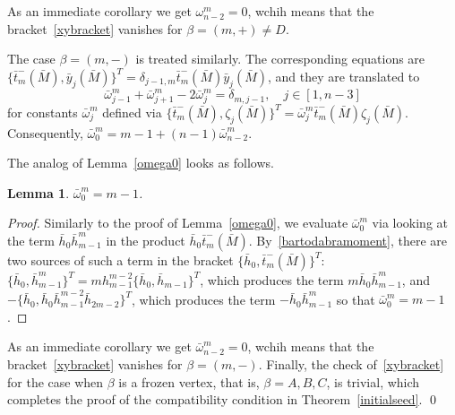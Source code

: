 \documentclass{amsart}
\newtheorem{lemma}[theorem]{Lemma}
\theoremstyle{definition}
\theoremstyle{remark}
\numberwithin{equation}{section}
\numberwithin{theorem}{section}
\begin{document}
As an immediate corollary we get $\omega_{n-2}^{m}=0$, wchih means that the bracket~\eqref{xybracket} vanishes for 
$\beta=(m,+)\ne D$.

The case $\beta=(m,-)$ is treated similarly. The corresponding equations are  $\{\bar t_m^-(\bar M),\bar y_j(\bar M)\}^T=\delta_{j-1,m}\bar t_m^-(\bar M)\bar y_j(\bar M)$, and they are translated to
\[
\bar\omega_{j-1}^{m}+\bar\omega_{j+1}^{m}-2\bar\omega_j^{m}=\delta_{m,j-1},\quad j\in[1,n-3]
\]
for constants $\bar\omega_j^{m}$ defined via $\{\bar t_m^-(\bar M),\zeta_j(\bar M)\}^T=\bar\omega_j^{m}\bar t_m^-(\bar M)\zeta_j(\bar M)$. Consequently, $\bar\omega_0^{m}=m-1+(n-1)\bar\omega_{n-2}^{m}$.

The analog of Lemma~\ref{omega0} looks as follows.

\begin{lemma}\label{baromega0}
$\bar\omega_0^m=m-1$.
\end{lemma}

\begin{proof} Similarly to the proof of Lemma~\ref{omega0}, we evaluate $\bar\omega_0^m$ via looking at the term
$\bar h_0\bar h_{m-1}^m$ in the product $\bar h_0\bar t_m^-(\bar M)$. By~\eqref{bartodabramoment}, there are two sources of such a term in the bracket $\{\bar h_0,\bar t_m^-(\bar M)\}^T$: 
$\{\bar h_0,\bar h_{m-1}^m\}^T=mh_{m-1}^{m-2}\{\bar h_0,\bar h_{m-1}\}^T$, which
produces the term $m\bar h_0\bar h_{m-1}^m$, and $-\{\bar h_0,\bar h_0\bar h_{m-1}^{m-2}\bar h_{2m-2}\}^T$, which 
produces the term $-\bar h_0\bar h_{m-1}^m$
so that $\bar\omega_0^m=m-1$.
\end{proof}
As an immediate corollary we get $\bar\omega_{n-2}^{m}=0$, wchih means that the bracket~\eqref{xybracket} vanishes for 
$\beta=(m,-)$. Finally, the check of~\eqref{xybracket} for the case when $\beta$ is a frozen vertex, that is, $\beta=A, B, C$, is trivial, which completes the proof of the compatibility condition in Theorem~\ref{initialseed}. \qed
\end{document}

